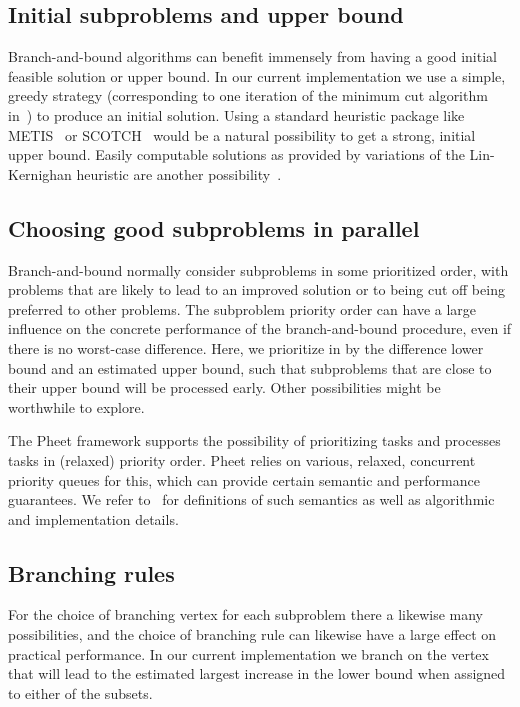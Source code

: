 \documentclass[a4paper,11pt]{article}
\begin{document}
\subsection{Initial subproblems and upper bound}

Branch-and-bound algorithms can benefit immensely from having a good
initial feasible solution or upper bound. In our current
implementation we use a simple, greedy strategy (corresponding to one
iteration of the minimum cut algorithm in~\cite{StoerWagner97}) to
produce an initial solution. Using a standard heuristic package like
METIS~\cite{karypis11} or SCOTCH~\cite{ChevalierPellegrini08} would be
a natural possibility to get a strong, initial upper bound. Easily
computable solutions as provided by variations of the Lin-Kernighan
heuristic are another
possibility~\cite{KernighanLin70,Traff06:kpartition}.

\subsection{Choosing good subproblems in parallel}

Branch-and-bound normally consider subproblems in some prioritized
order, with problems that are likely to lead to an improved solution
or to being cut off being preferred to other problems. The subproblem
priority order can have a large influence on the concrete performance
of the branch-and-bound procedure, even if there is no worst-case
difference. Here, we prioritize in by the difference lower bound and
an estimated upper bound, such that subproblems that are close to
their upper bound will be processed early. Other possibilities might
be worthwhile to explore.

The Pheet framework supports the possibility of prioritizing tasks and
processes tasks in (relaxed) priority order. Pheet relies on various,
relaxed, concurrent priority queues for this, which can provide
certain semantic and performance guarantees. We refer
to~\cite{Wimmer14:diss} for definitions of such semantics as well as
algorithmic and implementation details.

\subsection{Branching rules}

For the choice of branching vertex for each subproblem there a
likewise many possibilities, and the choice of branching rule can
likewise have a large effect on practical performance. In our current
implementation we branch on the vertex that will lead to the estimated
largest increase in the lower bound when assigned to either of the
subsets.
\end{document}
